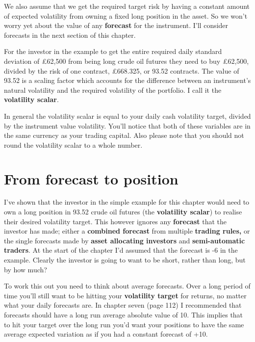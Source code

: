 We also assume that we get the required target risk by having a constant amount of expected volatility from owning a fixed long position in the asset. So we won't worry yet about the value of any \textbf{forecast} for the instrument. I'll consider forecasts in the next section of this chapter.

For the investor in the example to get the entire required daily standard deviation of £62,500 from being long crude oil futures they need to buy £62,500, divided by the risk of one contract, £668.325, or 93.52 contracts. The value of 93.52 is a scaling factor which accounts for the difference between an instrument's natural volatility and the required volatility of the portfolio. I call it the \textbf{volatility scalar}.

In general the volatility scalar is equal to your daily cash volatility target, divided by the instrument value volatility. You'll notice that both of these variables are in the same currency as your trading capital. Also please note that you should not round the volatility scalar to a whole number.

\section*{From forecast to position}  {}

I've shown that the investor in the simple example for this chapter would need to own a long position in 93.52 crude oil futures (the \textbf{volatility scalar}) to realise their desired volatility target. This however ignores any \textbf{forecast} that the investor has made; either a \textbf{combined forecast} from multiple \textbf{trading rules,} or the single forecasts made by \textbf{asset allocating investors} and \textbf{semi-automatic traders}. At the start of the chapter I'd assumed that the forecast is -6 in the example. Clearly the investor is going to want to be short, rather than long, but by how much?

To work this out you need to think about average forecasts. Over a long period of time you'll still want to be hitting your \textbf{volatility target} for returns, no matter what your daily forecasts are. In chapter seven (page 112) I recommended that forecasts should have a long run average absolute value of 10. This implies that to hit your target over the long run you'd want your positions to have the same average expected variation as if you had a constant forecast of +10.

